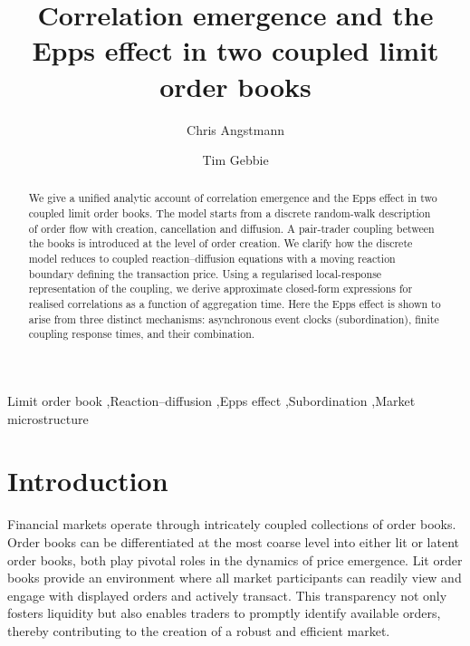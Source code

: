 \documentclass[5p,final]{elsarticle}
\begin{document}
\title{Correlation emergence and the Epps effect in two coupled limit order books}

\author[unsw-mathstats]{Chris Angstmann}
\address[unsw-mathstats]{School ofMathematics and Statistics, University of New South Wales, Sydney, NSW 2052, Australia}
\author[uct-sta]{Tim Gebbie} 
\address[uct-sta]{Department of Statisical Sciences, University of Cape Town, Rondebosch 7701, Western Cape, South Africa}

\begin{abstract}
We give a unified analytic account of correlation emergence and the Epps effect in two coupled limit order books. The model starts from a discrete random-walk description of order flow with creation, cancellation and diffusion. A pair-trader coupling between the books is introduced at the level of order creation. We clarify how the discrete model reduces to coupled reaction--diffusion equations with a moving reaction boundary defining the transaction price. Using a regularised local-response representation of the coupling, we derive approximate closed-form expressions for realised correlations as a function of aggregation time. Here the Epps effect is shown to arise from three distinct mechanisms: asynchronous event clocks (subordination), finite coupling response times, and their combination.
\end{abstract}

\begin{keyword}
Limit order book \sep Reaction--diffusion \sep Epps effect \sep Subordination \sep Market microstructure
\end{keyword}



\maketitle
\tableofcontents

\section{Introduction} \label{sec:introduction}

Financial markets operate through intricately coupled collections of order books. Order books can be differentiated at the most coarse level into either lit or latent order books, both play pivotal roles in the dynamics of price emergence. Lit order books provide an environment where all market participants can readily view and engage with displayed orders \citep{ohara1995} and actively transact. This transparency not only fosters liquidity but also enables traders to promptly identify available orders, thereby contributing to the creation of a robust and efficient market.
\end{document}
